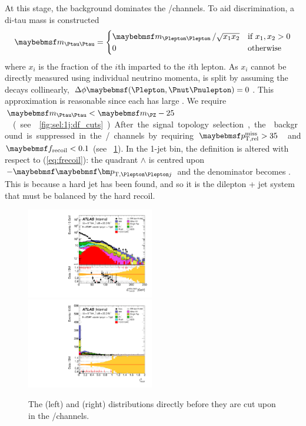 At this stage, the \DYtt background dominates the \emch/\mech channels. To aid 
discrimination, a di-tau mass is constructed
\begin{equation}
	\mtautau = 
		\begin{cases}
			\mll \,/ \sqrt{x_1 x_2} &\text{if}~x_1, x_2 > 0 \\
			0 &\text{otherwise}
		\end{cases}
\end{equation}
where $x_i$ is the \pt fraction of the $i$th \Ptau imparted to the $i$th lepton. As $x_i$ 
cannot be directly measured using individual neutrino momenta, \corrtrackmet is split by 
assuming the \Ptau decays collinearly, \ie 
$\Delta\phi\parenths{\Plepton,\HepProcess{\Pnut\Pnulepton}} = 0$. 
This approximation is reasonable since each \Ptau has large \pt. We require 
\unit{$\mtautau < \mZ - 25$}{\GeV} (see \Figure~\ref{fig:sel:1j:df_cuts}).

After the signal topology selection, the \DYll background is suppressed in the 
\eech/\mmch channels by requiring \unit{$\trackmetrel > 35$}{\GeV} and $\frecoil < 0.1$ 
(see \Figure~\ref{fig:sel:1j:sf_cuts}). In the 1-jet bin, the \frecoil definition is 
altered with respect to (\ref{eq:frecoil}): the quadrant $\wedge$ is centred upon 
$-\ptlljvec$ and the denominator becomes \ptllj. This is because a hard jet has been 
found, and so it is the dilepton + jet system that must be balanced by the hard recoil.

\begin{figure}
	\includegraphics[width=0.495\textwidth]{tex/selection/eemm_CutTopoMll_1jet_METRel_TrackHWW_Clj_mh125_log}
	\hfill
	\includegraphics[width=0.495\textwidth]{tex/selection/eemm_CutTopoDPhill_1jet_f_recoil_ext_mh125_lin}
	\caption{The \corrtrackmetrel (left) and \frecoil (right) distributions directly 
	before they are cut upon in the \eech/\mmch channels.}
	\label{fig:sel:1j:sf_cuts}
\end{figure}

